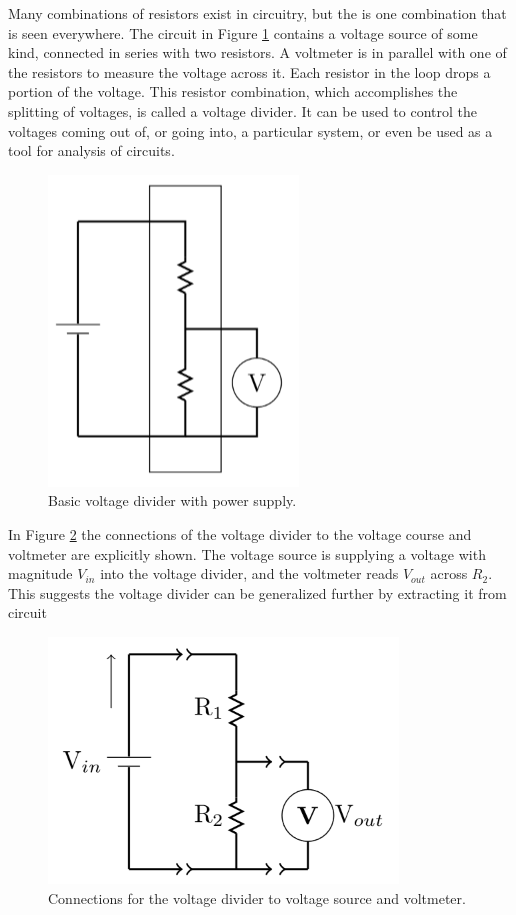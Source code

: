 \noindent Many combinations of resistors exist in circuitry, but the  is one combination that is seen everywhere. The circuit in Figure \ref{fig:DC3} contains a voltage source of some kind, connected in series with two resistors. A voltmeter is in parallel with one of the resistors to measure the voltage across it. Each resistor in the loop drops a portion of the voltage. This resistor combination, which accomplishes the splitting of voltages, is called a voltage divider. It can be used to control the voltages coming out of, or going into, a particular system, or even be used as a tool for analysis of circuits.

\begin{figure}[H]
    \centering
    \includegraphics[scale = 0.8]{Images/DC3.PNG}
    \caption{Basic voltage divider with power supply.}
    \label{fig:DC3}
\end{figure}

\noindent In Figure \ref{fig:DC4} the connections of the voltage divider to the voltage course and voltmeter are explicitly shown. The voltage source is supplying a voltage with magnitude $V_{in}$ into the voltage divider, and the voltmeter reads $V_{out}$ across $R_2$. This suggests the voltage divider can be generalized further by extracting it from circuit

\begin{figure}[H]
    \centering
    \includegraphics[scale = 0.8]{Images/DC4.PNG}
    \caption{Connections for the voltage divider to voltage source and voltmeter.}
    \label{fig:DC4}
\end{figure}


